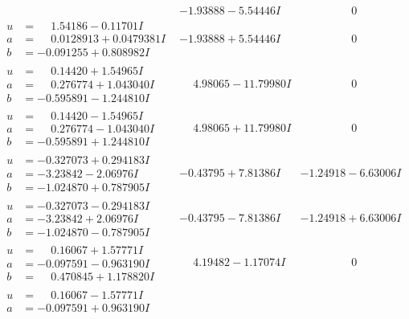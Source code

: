 \documentclass[1p]{elsarticle_modified}
\theoremstyle{definition}
\begin{document}
$$\begin{array}{c|c|c}
 & -1.93888 - 5.54446 I & \phantom{-0.000000 } 0 \\ \hline\begin{aligned}
u &= \phantom{-}1.54186 - 0.11701 I \\
a &= \phantom{-}0.0128913 + 0.0479381 I \\
b &= -0.091255 + 0.808982 I\end{aligned}
 & -1.93888 + 5.54446 I & \phantom{-0.000000 } 0 \\ \hline\begin{aligned}
u &= \phantom{-}0.14420 + 1.54965 I \\
a &= \phantom{-}0.276774 + 1.043040 I \\
b &= -0.595891 - 1.244810 I\end{aligned}
 & \phantom{-}4.98065 - 11.79980 I & \phantom{-0.000000 } 0 \\ \hline\begin{aligned}
u &= \phantom{-}0.14420 - 1.54965 I \\
a &= \phantom{-}0.276774 - 1.043040 I \\
b &= -0.595891 + 1.244810 I\end{aligned}
 & \phantom{-}4.98065 + 11.79980 I & \phantom{-0.000000 } 0 \\ \hline\begin{aligned}
u &= -0.327073 + 0.294183 I \\
a &= -3.23842 - 2.06976 I \\
b &= -1.024870 + 0.787905 I\end{aligned}
 & -0.43795 + 7.81386 I & -1.24918 - 6.63006 I \\ \hline\begin{aligned}
u &= -0.327073 - 0.294183 I \\
a &= -3.23842 + 2.06976 I \\
b &= -1.024870 - 0.787905 I\end{aligned}
 & -0.43795 - 7.81386 I & -1.24918 + 6.63006 I \\ \hline\begin{aligned}
u &= \phantom{-}0.16067 + 1.57771 I \\
a &= -0.097591 - 0.963190 I \\
b &= \phantom{-}0.470845 + 1.178820 I\end{aligned}
 & \phantom{-}4.19482 - 1.17074 I & \phantom{-0.000000 } 0 \\ \hline\begin{aligned}
u &= \phantom{-}0.16067 - 1.57771 I \\
a &= -0.097591 + 0.963190 I \\

\end{aligned}
\end{array}$$
\end{document}
